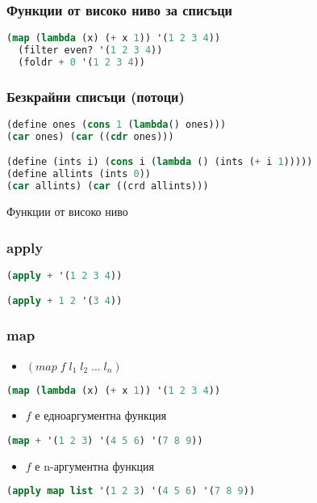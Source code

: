 \documentclass{beamer}
\begin{document}
\begin{frame}[fragile]
\frametitle{Функции от високо ниво за списъци}

\begin{lstlisting}[language=Lisp]
  (map (lambda (x) (+ x 1)) '(1 2 3 4))
  (filter even? '(1 2 3 4))
  (foldr + 0 '(1 2 3 4))
\end{lstlisting}

\end{frame}


\begin{frame}[fragile]
\frametitle{Безкрайни списъци (потоци)}

\begin{lstlisting}[language=Lisp]
(define ones (cons 1 (lambda() ones)))
(car ones) (car ((cdr ones)))

(define (ints i) (cons i (lambda () (ints (+ i 1)))))
(define allints (ints 0))
(car allints) (car ((crd allints)))
\end{lstlisting}

\end{frame}

\begin{frame}
  \centerline{Функции от високо ниво}
\end{frame}

\begin{frame}[fragile]
\frametitle{apply}
\begin{lstlisting}[language=Lisp]
(apply + '(1 2 3 4))

(apply + 1 2 '(3 4))
\end{lstlisting}
\end{frame}

\begin{frame}[fragile]
\frametitle{map}

\begin{itemize}
  \item $(map \; f \; l_1 \; l_2 \; ... \; l_n)$
\end{itemize}

\begin{lstlisting}[language=Lisp]
(map (lambda (x) (+ x 1)) '(1 2 3 4))
\end{lstlisting}
\begin{itemize}
  \item $f$ е едноаргументна функция
\end{itemize}

\begin{lstlisting}[language=Lisp]
(map + '(1 2 3) '(4 5 6) '(7 8 9))
\end{lstlisting}
\begin{itemize}
  \item $f$ е n-аргументна функция
\end{itemize}

\begin{lstlisting}[language=Lisp]
(apply map list '(1 2 3) '(4 5 6) '(7 8 9))
\end{lstlisting}

\end{frame}
\end{document}
